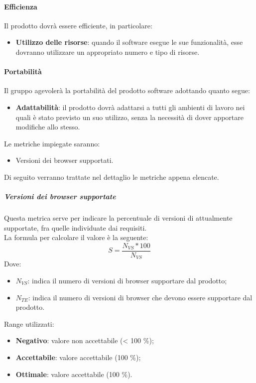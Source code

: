 \documentclass[../PianoDiQualifica.tex]{subfiles}
\begin{document}
			\paragraph{Efficienza}
			Il prodotto dovrà essere efficiente, in particolare:
			\begin{itemize}
				\item \textbf{Utilizzo delle risorse}: quando il software esegue le sue funzionalità, esse dovranno utilizzare un appropriato numero e tipo di risorse.
			\end{itemize}
			\paragraph{Portabilità}
			Il gruppo agevolerà la portabilità del prodotto software adottando quanto segue:
			\begin{itemize}
				\item \textbf{Adattabilità}: il prodotto dovrà adattarsi a tutti gli ambienti di lavoro nei quali è stato previsto un suo utilizzo, senza la necessità di dover apportare modifiche allo stesso.
			\end{itemize}
			Le metriche impiegate saranno:
			\begin{itemize}
				\item Versioni dei browser supportati.
			\end{itemize}
			Di seguito verranno trattate nel dettaglio le metriche appena elencate.

			\subparagraph{Versioni dei browser supportate}
			Questa metrica serve per indicare la percentuale di versioni di  attualmente supportate, fra quelle individuate dai requisiti. \\La formula per calcolare il valore è la seguente:
			\begin{equation*}
				S = \frac{N_{VS}*100}{N_{VS}}
			\end{equation*}
			Dove:
			\begin{itemize}
				\item \textbf{$N_{VS}$}: indica il numero di versioni di browser supportare dal prodotto;
				\item \textbf{$N_{TE}$}: indica il numero di versioni di browser che devono essere supportare dal prodotto.
			\end{itemize}
			Range utilizzati:
			\begin{itemize}
				\item \textbf{Negativo}: valore non accettabile (< 100 \%);
				\item \textbf{Accettabile}: valore accettabile (100 \%);
				\item \textbf{Ottimale}: valore accettabile (100 \%).
			\end{itemize}
\end{document}
